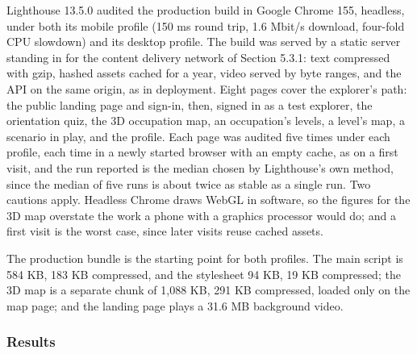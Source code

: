 Lighthouse 13.5.0 audited the production build in Google Chrome 155, headless, under both its mobile profile (150 ms round trip, 1.6 Mbit/s download, four-fold CPU slowdown) and its desktop profile. The build was served by a static server standing in for the content delivery network of Section 5.3.1: text compressed with gzip, hashed assets cached for a year, video served by byte ranges, and the API on the same origin, as in deployment. Eight pages cover the explorer's path: the public landing page and sign-in, then, signed in as a test explorer, the orientation quiz, the 3D occupation map, an occupation's levels, a level's map, a scenario in play, and the profile. Each page was audited five times under each profile, each time in a newly started browser with an empty cache, as on a first visit, and the run reported is the median chosen by Lighthouse's own method, since the median of five runs is about twice as stable as a single run\cite{r202}. Two cautions apply. Headless Chrome draws WebGL in software, so the figures for the 3D map overstate the work a phone with a graphics processor would do; and a first visit is the worst case, since later visits reuse cached assets.

The production bundle is the starting point for both profiles. The main script is 584 KB, 183 KB compressed, and the stylesheet 94 KB, 19 KB compressed; the 3D map is a separate chunk of 1,088 KB, 291 KB compressed, loaded only on the map page; and the landing page plays a 31.6 MB background video.

\subsubsection{Results}

